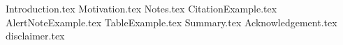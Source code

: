 \documentclass[aspectratio=\BeamerAspectRatio]{beamer}
\begin{document}
\maketitlepage %
\maketableofcontents %
\makesectionpopup %

{Introduction.tex}
{Motivation.tex}
{Notes.tex}
{CitationExample.tex}
{AlertNoteExample.tex}
{TableExample.tex}
{Summary.tex}
{Acknowledgement.tex}
{disclaimer.tex}
\end{document}
